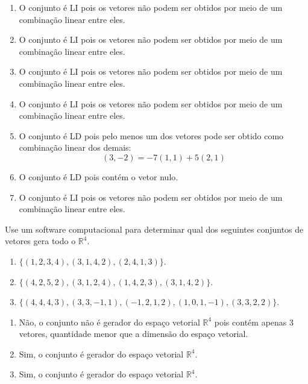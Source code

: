 \begin{resolution}
  \vspace{-24pt}
  \begin{enumerate}[label=\alph*)]
    \item O conjunto é LI pois os vetores não podem ser obtidos por meio de um combinação linear entre eles.
    \item O conjunto é LI pois os vetores não podem ser obtidos por meio de um combinação linear entre eles.
    \item O conjunto é LI pois os vetores não podem ser obtidos por meio de um combinação linear entre eles.
    \item O conjunto é LI pois os vetores não podem ser obtidos por meio de um combinação linear entre eles.
    \item O conjunto é LD pois pelo menos um dos vetores pode ser obtido como combinação linear dos demais:
          \begin{equation}
            (3, -2) = - 7 (1, 1) + 5 (2, 1)
          \end{equation}
    \item O conjunto é LD pois contém o vetor nulo.
    \item O conjunto é LI pois os vetores não podem ser obtidos por meio de um combinação linear entre eles.
  \end{enumerate}
\end{resolution}

\begin{question}
  Use um software computacional para determinar qual dos seguintes conjuntos de vetores gera todo o $\mathbb{R}^4$.
  \begin{enumerate}[label=\alph*)]
    \item $\{(1, 2, 3, 4), (3, 1, 4, 2), (2, 4, 1, 3)\}$.
    \item $\{(4, 2, 5, 2), (3, 1, 2, 4), (1, 4, 2, 3), (3, 1, 4, 2)\}$.
    \item $\{(4, 4, 4, 3), (3, 3, -1, 1), (-1, 2, 1, 2), (1, 0, 1, -1), (3, 3, 2, 2)\}$.
  \end{enumerate}
\end{question}

\begin{resolution}
  \vspace{-24pt}
  \begin{enumerate}[label=\alph*)]
    \item Não, o conjunto não é gerador do espaço vetorial $\mathbb{R}^4$ pois contém apenas 3 vetores, quantidade menor que a dimensão do espaço vetorial.
    \item Sim, o conjunto é gerador do espaço vetorial $\mathbb{R}^4$.
    \item Sim, o conjunto é gerador do espaço vetorial $\mathbb{R}^4$.
  \end{enumerate}
\end{resolution}

